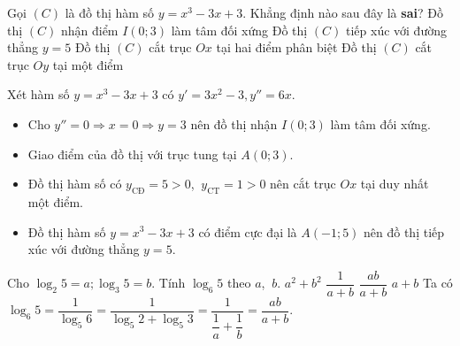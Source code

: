 \begin{ex}%
Gọi $ (C) $ là đồ thị hàm số $ y = x^3 - 3x + 3. $ Khẳng định nào sau đây là \textbf{sai}?
\choice
{Đồ thị $ (C) $ nhận điểm $ I(0;3) $ làm tâm đối xứng}
{ Đồ thị $ (C) $ tiếp xúc với đường thẳng $ y = 5 $}
{\True Đồ thị $ (C) $ cắt trục $ Ox $ tại hai điểm phân biệt}
{Đồ thị $ (C) $ cắt trục $ Oy $ tại một điểm}
	\loigiai
	{
Xét hàm số $ y = x^3 - 3x + 3  $ có 
$y' = 3x^2 - 3, y''=6x$.
\begin{itemize}
	\item Cho $ y'' = 0 \Rightarrow x = 0 \Rightarrow y = 3 $ nên đồ thị nhận $ I(0;3) $ làm tâm đối xứng.
	\item Giao điểm của đồ thị với trục tung tại $ A(0;3). $
	\item Đồ thị hàm số có $ y_{\text{CĐ}} = 5>0$, $\ y_{\text{CT}} =1>0 $ nên cắt trục $ Ox $ tại duy nhất một điểm.
	\item Đồ thị hàm số $ y = x^3 - 3x + 3 $ có điểm cực đại là $ A(-1;5) $ nên đồ thị tiếp xúc với đường thẳng $ y = 5. $
\end{itemize}

	}
\end{ex}
\begin{ex}%
Cho $ \log_2 5 = a; \log_3 5 = b $. Tính $ \log_6 5  $ theo $ a$, $\ b. $
	\choice
	{$ a^2 + b^2 $}
	{$ \dfrac{1}{a+b} $}
	{\True $ \dfrac{ab}{a+b} $}
{$ a+b $}
	\loigiai
	{
Ta có $ \log_6 5 = \dfrac{1}{\log_5 6 }  = \dfrac{1}{\log_5 2+\log_5 3} =  \dfrac{1}{\dfrac{1}{a} + \dfrac{1}{b}} = \dfrac{ab}{a+b}. $
	}
\end{ex}
